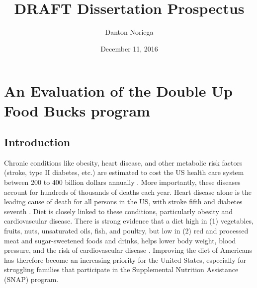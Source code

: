 \documentclass[12pt,letterpaperpaper,]{book}
\title{DRAFT Dissertation Prospectus}
\author{Danton Noriega}
\date{December 11, 2016}
\begin{document}
\maketitle

\setlength{\abovedisplayskip}{-5pt}
\setlength{\abovedisplayshortskip}{-5pt}
\mainmatter

{
\setcounter{tocdepth}{2}
\tableofcontents
}
\chapter{An Evaluation of the Double Up Food Bucks
program}\label{chapter-1}

\section*{Introduction}\label{intro-1}

Chronic conditions like obesity, heart disease, and other metabolic risk
factors (stroke, type II diabetes, etc.) are estimated to cost the US
health care system between 200 to 400 billion dollars annually
\citep{cawley_medical_2012, chatterjee_checkup_2014}. More importantly,
these diseases account for hundreds of thousands of deaths each year.
Heart disease alone is the leading cause of death for all persons in the
US, with stroke fifth and diabetes seventh
\citep{national_center_for_health_statistics_health_2015}. Diet is
closely linked to these conditions, particularly obesity and
cardiovascular disease. There is strong evidence that a diet high in (1)
vegetables, fruits, nuts, unsaturated oils, fish, and poultry, but low
in (2) red and processed meat and sugar-sweetened foods and drinks,
helps lower body weight, blood pressure, and the risk of cardiovascular
disease
\citep{mente_systematic_2009, nutrition_evidence_library_series_2014}.
Improving the diet of Americans has therefore become an increasing
priority for the United States, especially for struggling families that
participate in the Supplemental Nutrition Assistance (SNAP) program.
\end{document}
